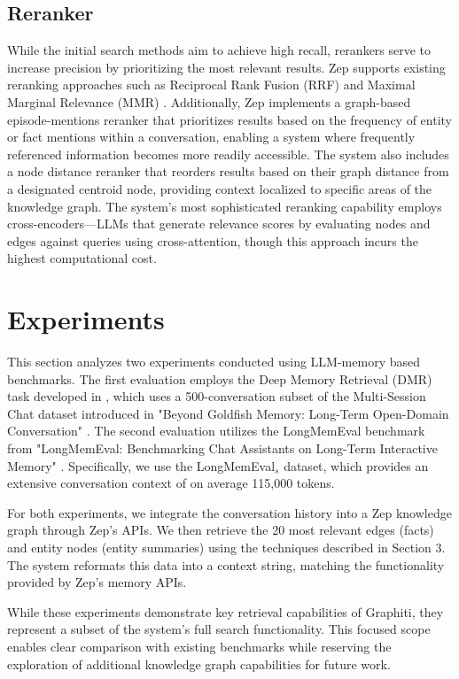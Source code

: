 \documentclass{article}
\begin{document}
\subsection{Reranker}
While the initial search methods aim to achieve high recall, rerankers serve to increase precision by prioritizing the most relevant results. Zep supports existing reranking approaches such as Reciprocal Rank Fusion (RRF) \cite{rrf2009} and Maximal Marginal Relevance (MMR) \cite{mmr}. Additionally, Zep implements a graph-based episode-mentions reranker that prioritizes results based on the frequency of entity or fact mentions within a conversation, enabling a system where frequently referenced information becomes more readily accessible. The system also includes a node distance reranker that reorders results based on their graph distance from a designated centroid node, providing context localized to specific areas of the knowledge graph. The system's most sophisticated reranking capability employs cross-encoders—LLMs that generate relevance scores by evaluating nodes and edges against queries using cross-attention, though this approach incurs the highest computational cost.

\section{Experiments}
This section analyzes two experiments conducted using LLM-memory based benchmarks. The first evaluation employs the Deep Memory Retrieval (DMR) task developed in \cite{memgpt}, which uses a 500-conversation subset of the Multi-Session Chat dataset introduced in "Beyond Goldfish Memory: Long-Term Open-Domain Conversation" \cite{goldfishmemory}. The second evaluation utilizes the LongMemEval benchmark from "LongMemEval: Benchmarking Chat Assistants on Long-Term Interactive Memory" \cite{longmemeval}. Specifically, we use the LongMemEval$_{s}$ dataset, which provides an extensive conversation context of on average 115,000 tokens.

For both experiments, we integrate the conversation history into a Zep knowledge graph through Zep's APIs. We then retrieve the 20 most relevant edges (facts) and entity nodes (entity summaries) using the techniques described in Section 3. The system reformats this data into a context string, matching the functionality provided by Zep's memory APIs.

While these experiments demonstrate key retrieval capabilities of Graphiti, they represent a subset of the system's full search functionality. This focused scope enables clear comparison with existing benchmarks while reserving the exploration of additional knowledge graph capabilities for future work.
\end{document}
